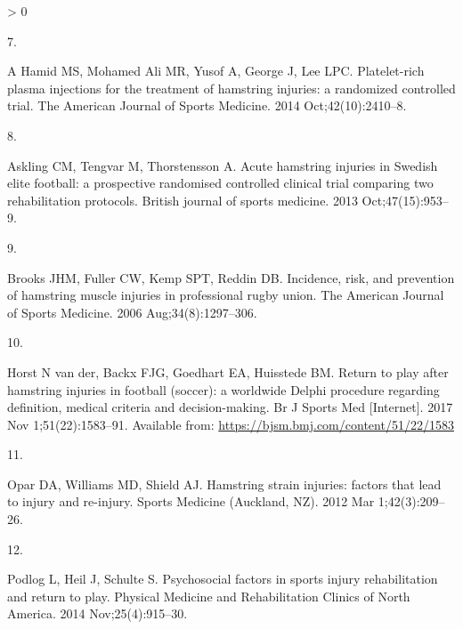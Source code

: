 \documentclass[
]{article}
\newlength{\cslhangindent}
\newlength{\csllabelwidth}
\newenvironment{CSLReferences}[2] %
 {%
  \setlength{\parindent}{0pt}
  \ifodd #1 \everypar{\setlength{\hangindent}{\cslhangindent}}\ignorespaces\fi
  \ifnum #2 > 0
  \setlength{\parskip}{#2\baselineskip}
  \fi
 }%
 {}
\newcommand{\CSLLeftMargin}[1]{\parbox[t]{\csllabelwidth}{#1}}
\newcommand{\CSLRightInline}[1]{\parbox[t]{\linewidth - \csllabelwidth}{#1}\break}
\begin{document}
\begin{CSLReferences}{0}{0}
\leavevmode\hypertarget{ref-ahamid2014}{}%
\CSLLeftMargin{7. }
\CSLRightInline{A Hamid MS, Mohamed Ali MR, Yusof A, George J, Lee LPC.
Platelet-rich plasma injections for the treatment of hamstring injuries:
a randomized controlled trial. The American Journal of Sports Medicine.
2014 Oct;42(10):2410--8. }

\leavevmode\hypertarget{ref-askling2013}{}%
\CSLLeftMargin{8. }
\CSLRightInline{Askling CM, Tengvar M, Thorstensson A. Acute hamstring
injuries in Swedish elite football: a prospective randomised controlled
clinical trial comparing two rehabilitation protocols. British journal
of sports medicine. 2013 Oct;47(15):953--9. }

\leavevmode\hypertarget{ref-brooks2006}{}%
\CSLLeftMargin{9. }
\CSLRightInline{Brooks JHM, Fuller CW, Kemp SPT, Reddin DB. Incidence,
risk, and prevention of hamstring muscle injuries in professional rugby
union. The American Journal of Sports Medicine. 2006
Aug;34(8):1297--306. }

\leavevmode\hypertarget{ref-horst2017}{}%
\CSLLeftMargin{10. }
\CSLRightInline{Horst N van der, Backx FJG, Goedhart EA, Huisstede BM.
Return to play after hamstring injuries in football (soccer): a
worldwide Delphi procedure regarding definition, medical criteria and
decision-making. Br J Sports Med {[}Internet{]}. 2017 Nov
1;51(22):1583--91. Available from:
\url{https://bjsm.bmj.com/content/51/22/1583}}

\leavevmode\hypertarget{ref-opar2012}{}%
\CSLLeftMargin{11. }
\CSLRightInline{Opar DA, Williams MD, Shield AJ. Hamstring strain
injuries: factors that lead to injury and re-injury. Sports Medicine
(Auckland, NZ). 2012 Mar 1;42(3):209--26. }

\leavevmode\hypertarget{ref-podlog2014}{}%
\CSLLeftMargin{12. }
\CSLRightInline{Podlog L, Heil J, Schulte S. Psychosocial factors in
sports injury rehabilitation and return to play. Physical Medicine and
Rehabilitation Clinics of North America. 2014 Nov;25(4):915--30. }

\end{CSLReferences}
\end{document}
